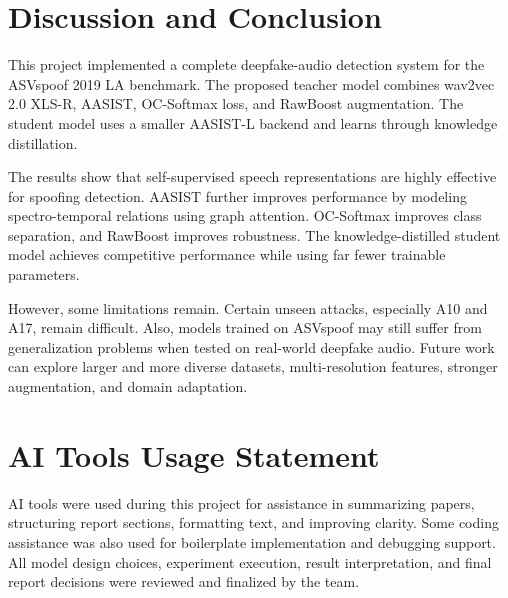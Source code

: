 \documentclass[sigconf]{acmart}
\begin{document}
\section{Discussion and Conclusion}

This project implemented a complete deepfake-audio detection system for the ASVspoof 2019 LA benchmark. The proposed teacher model combines wav2vec 2.0 XLS-R, AASIST, OC-Softmax loss, and RawBoost augmentation. The student model uses a smaller AASIST-L backend and learns through knowledge distillation.

The results show that self-supervised speech representations are highly effective for spoofing detection. AASIST further improves performance by modeling spectro-temporal relations using graph attention. OC-Softmax improves class separation, and RawBoost improves robustness. The knowledge-distilled student model achieves competitive performance while using far fewer trainable parameters.

However, some limitations remain. Certain unseen attacks, especially A10 and A17, remain difficult. Also, models trained on ASVspoof may still suffer from generalization problems when tested on real-world deepfake audio. Future work can explore larger and more diverse datasets, multi-resolution features, stronger augmentation, and domain adaptation.

\section*{AI Tools Usage Statement}

AI tools were used during this project for assistance in summarizing papers, structuring report sections, formatting text, and improving clarity. Some coding assistance was also used for boilerplate implementation and debugging support. All model design choices, experiment execution, result interpretation, and final report decisions were reviewed and finalized by the team.
\end{document}
